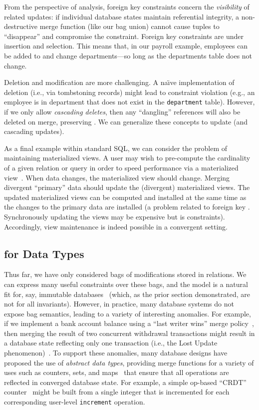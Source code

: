 From the perspective of \iconfluence analysis, foreign key constraints
concern the \textit{visibility} of related updates: if individual
database states maintain referential integrity, a non-destructive
merge function (like our bag union) cannot cause tuples to
``disappear'' and compromise the constraint. Foreign key constraints
are \iconfluent under insertion and selection. This means that, in our
payroll example, employees can be added to and change departments---so
long as the departments table does not change.

Deletion and modification are more challenging. A na\"{\i}ve
implementation of deletion (i.e., via tombstoning records) might lead
to constraint violation (e.g., an employee is in department that does
not exist in the \texttt{department} table). However, if we only allow
\textit{cascading deletes}, then any ``dangling'' references will also
be deleted on merge, preserving \iconfluence. We can generalize these
concepts to update (and cascading updates).

 As a final example within standard SQL,
we can consider the problem of maintaining materialized views. A user
may wish to pre-compute the cardinality of a given relation or query
in order to speed performance via a materialized
view~\cite{gray-book}. When data changes, the materialized view should
change. Merging divergent ``primary'' data should update the
(divergent) materialized views. The updated materialized views can be
computed and installed at the same time as the changes to the primary
data are installed (a problem related to foreign key
\iconfluent. Synchronously updating the views may be expensive but is
constraints). Accordingly, view maintenance is indeed possible in a convergent setting.

\subsection{\iconfluence for Data Types}

Thus far, we have only considered bags of modifications stored in
relations. We can express many useful constraints over these bags, and
the model is a natural fit for, say, immutable
databases~\cite{gray-virtues,gray-book} (which, as the prior section
demonstrated, are not \iconfluent for all invariants). However, in
practice, many database systems do not expose bag semantics, leading
to a variety of interesting anomalies. For example, if we implement a
bank account balance using a ``last writer wins'' merge
policy~\cite{vogels-defs}, then merging the result of two concurrent
withdrawal transactions might result in a database state reflecting
only one transaction (i.e., the Lost Update
phenomenon)~\cite{adya-isolation,hat-vldb}. To support these
anomalies, many database designs have proposed the use of
\textit{abstract data types}, providing merge functions for a variety
of uses such as counters, sets, and
maps~\cite{crdt,atomictransactions,weihl-thesis,blooml} that ensure
that all operations are reflected in converged database state. For
example, a simple op-based ``CRDT'' counter~\cite{crdt} might be built
from a single integer that is incremented for each corresponding
user-level \texttt{increment} operation.


